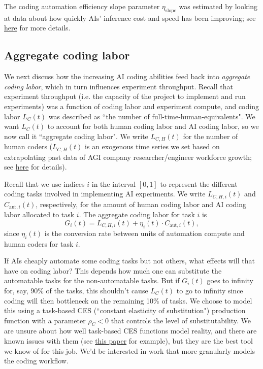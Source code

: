 \documentclass{article}
\theoremstyle{definition}
\begin{document}
The coding automation efficiency slope parameter $\eta_\text{slope}$ was estimated by looking at data about how quickly AIs' inference cost and speed has been improving; see \href{https://docs.google.com/document/d/1ru6Okbxb6XuH18Cz8439sdQJazMV39hNxsWDokh97r0/edit?tab=t.0#bookmark=kix.bjmd2ywhp5i5}{here} for more details.

\subsection{Aggregate coding labor} \label{Aggregate coding labor}

We next discuss how the increasing AI coding abilities feed back into \textit{aggregate coding labor}, which in turn influences experiment throughput. Recall that experiment throughput (i.e. the capacity of the project to implement and run experiments) was a function of coding labor and experiment compute, and coding labor $L_C(t)$ was described as ``the number of full-time-human-equivalents". We want $L_C(t)$ to account for both human coding labor and AI coding labor, so we now call it ``aggregate coding labor". We write $L_{C,H}(t)$ for the number of human coders ($L_{C,H}(t)$ is an exogenous time series we set based on extrapolating past data of AGI company researcher/engineer workforce growth; see \href{https://docs.google.com/document/d/1ru6Okbxb6XuH18Cz8439sdQJazMV39hNxsWDokh97r0/edit?tab=t.0#bookmark=kix.tj2rutyi70ts}{here} for details).

Recall that we use indices $i$ in the interval $[0,1]$ to represent the different coding tasks involved in implementing AI experiments. We write $L_{C,H,i}(t)$ and $C_{\text{aut},i}(t)$, respectively, for the amount of human coding labor and AI coding labor allocated to task $i$. The aggregate coding labor for task $i$ is
\[ G_i(t) = L_{C,H,i}(t) + \eta_i(t) \cdot C_{\text{aut},i}(t),\]
since $\eta_i(t)$ is the conversion rate between units of automation compute and human coders for task $i$.

If AIs cheaply automate some coding tasks but not others, what effects will that have on coding labor? This depends how much one can substitute the automatable tasks for the non-automatable tasks. But if $G_i(t)$ goes to infinity for, say, 90\% of the tasks, this shouldn't cause $L_C(t)$ to go to infinity since coding will then bottleneck on the remaining 10\% of tasks. We choose to model this using a task-based CES (``constant elasticity of substitution") production function with a parameter $\rho_C < 0$ that controls the level of substitutability. We are unsure about how well task-based CES functions model reality, and there are known issues with them (see \href{https://philiptrammell.com/static/Workflows_and_Automation.pdf}{this paper} for example), but they are the best tool we know of for this job. We'd be interested in work that more granularly models the coding workflow.
\end{document}
